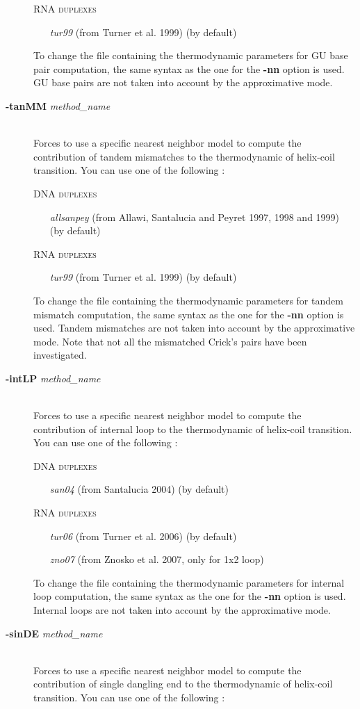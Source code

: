 \documentclass{article}
\begin{document}
\begin{description}
  \textsc{RNA duplexes}
    \begin{itemize}
    \item [\textit{tur99}] (from Turner et al. 1999) (by default)		 		 
    \end{itemize}
  To change the file containing the thermodynamic parameters for GU base pair computation, the same syntax as the one for the \textbf{-nn} option is used.
  GU base pairs are not taken into account by the approximative mode.
\item [\textbf{-tanMM} \textit{method\_name}]\mbox{}\\ 
  Forces to use a specific nearest neighbor model to compute the contribution of tandem mismatches to the thermodynamic of helix-coil transition. 
  You can use one of the following :
  
  \textsc{DNA duplexes}
    \begin{itemize}
    \item [\textit{allsanpey}] (from Allawi, Santalucia and Peyret 1997, 1998 and 1999)  (by default) 
    \end{itemize}
  \textsc{RNA duplexes}
    \begin{itemize}
    \item [\textit{tur99}] (from Turner et al. 1999) (by default)		 		 
    \end{itemize}
  To change the file containing the thermodynamic parameters for tandem mismatch computation, the same syntax as the one for the \textbf{-nn} option is used.
  Tandem mismatches are not taken into account by the approximative mode. Note that not all the mismatched Crick's pairs have been investigated. 
\item [\textbf{-intLP} \textit{method\_name}]\mbox{}\\ 
  Forces to use a specific nearest neighbor model to compute the contribution of internal loop to the thermodynamic of helix-coil transition. 
  You can use one of the following :
  
  \textsc{DNA duplexes}
    \begin{itemize}
    \item [\textit{san04}] (from Santalucia 2004)  (by default) 
    \end{itemize}
  \textsc{RNA duplexes}
    \begin{itemize}
    \item [\textit{tur06}] (from Turner et al. 2006) (by default)
    \item [\textit{zno07}] (from Znosko et al. 2007, only for 1x2 loop)  
    \end{itemize}
  To change the file containing the thermodynamic parameters for internal loop computation, the same syntax as the one for the \textbf{-nn} option is used.
  Internal loops are not taken into account by the approximative mode.   
\item [\textbf{-sinDE} \textit{method\_name}]\mbox{}\\ 
  Forces to use a specific nearest neighbor model to compute the contribution of single dangling end to the thermodynamic of helix-coil transition. 
  You can use one of the following :
  

\end{description}
\end{document}
